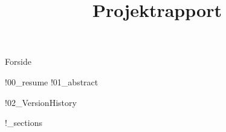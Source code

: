 \documentclass[a4paper,openany]{memoir}
\title{Projektrapport}
\begin{document}
	{Forside}  \newpage

	{!00_resume}
	{!01_abstract} \newpage

	\tableofcontents\thispagestyle{fancy}
	{!02_VersionHistory}  \newpage

	{!_sections}

	 {}
	\printbibliography \newpage

	\listoffixmes
\end{document}
